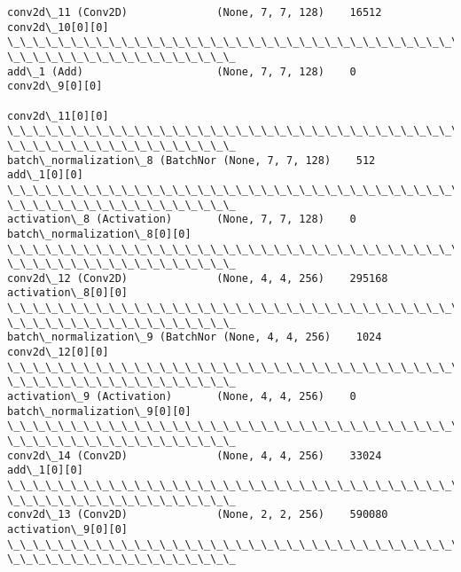 \documentclass[11pt]{article}
\begin{document}
\begin{Verbatim}[commandchars=\\\{\}]
conv2d\_11 (Conv2D)              (None, 7, 7, 128)    16512       conv2d\_10[0][0]
\_\_\_\_\_\_\_\_\_\_\_\_\_\_\_\_\_\_\_\_\_\_\_\_\_\_\_\_\_\_\_\_\_\_\_\_\_\_\_\_\_\_\_\_\_\_\_\_\_\_\_\_\_\_\_\_\_\_\_\_\_\_\_\_\_\_\_\_\_\_\_\_\_\_\_\_\_\_\_\_
\_\_\_\_\_\_\_\_\_\_\_\_\_\_\_\_\_\_
add\_1 (Add)                     (None, 7, 7, 128)    0           conv2d\_9[0][0]
                                                                 conv2d\_11[0][0]
\_\_\_\_\_\_\_\_\_\_\_\_\_\_\_\_\_\_\_\_\_\_\_\_\_\_\_\_\_\_\_\_\_\_\_\_\_\_\_\_\_\_\_\_\_\_\_\_\_\_\_\_\_\_\_\_\_\_\_\_\_\_\_\_\_\_\_\_\_\_\_\_\_\_\_\_\_\_\_\_
\_\_\_\_\_\_\_\_\_\_\_\_\_\_\_\_\_\_
batch\_normalization\_8 (BatchNor (None, 7, 7, 128)    512         add\_1[0][0]
\_\_\_\_\_\_\_\_\_\_\_\_\_\_\_\_\_\_\_\_\_\_\_\_\_\_\_\_\_\_\_\_\_\_\_\_\_\_\_\_\_\_\_\_\_\_\_\_\_\_\_\_\_\_\_\_\_\_\_\_\_\_\_\_\_\_\_\_\_\_\_\_\_\_\_\_\_\_\_\_
\_\_\_\_\_\_\_\_\_\_\_\_\_\_\_\_\_\_
activation\_8 (Activation)       (None, 7, 7, 128)    0
batch\_normalization\_8[0][0]
\_\_\_\_\_\_\_\_\_\_\_\_\_\_\_\_\_\_\_\_\_\_\_\_\_\_\_\_\_\_\_\_\_\_\_\_\_\_\_\_\_\_\_\_\_\_\_\_\_\_\_\_\_\_\_\_\_\_\_\_\_\_\_\_\_\_\_\_\_\_\_\_\_\_\_\_\_\_\_\_
\_\_\_\_\_\_\_\_\_\_\_\_\_\_\_\_\_\_
conv2d\_12 (Conv2D)              (None, 4, 4, 256)    295168
activation\_8[0][0]
\_\_\_\_\_\_\_\_\_\_\_\_\_\_\_\_\_\_\_\_\_\_\_\_\_\_\_\_\_\_\_\_\_\_\_\_\_\_\_\_\_\_\_\_\_\_\_\_\_\_\_\_\_\_\_\_\_\_\_\_\_\_\_\_\_\_\_\_\_\_\_\_\_\_\_\_\_\_\_\_
\_\_\_\_\_\_\_\_\_\_\_\_\_\_\_\_\_\_
batch\_normalization\_9 (BatchNor (None, 4, 4, 256)    1024        conv2d\_12[0][0]
\_\_\_\_\_\_\_\_\_\_\_\_\_\_\_\_\_\_\_\_\_\_\_\_\_\_\_\_\_\_\_\_\_\_\_\_\_\_\_\_\_\_\_\_\_\_\_\_\_\_\_\_\_\_\_\_\_\_\_\_\_\_\_\_\_\_\_\_\_\_\_\_\_\_\_\_\_\_\_\_
\_\_\_\_\_\_\_\_\_\_\_\_\_\_\_\_\_\_
activation\_9 (Activation)       (None, 4, 4, 256)    0
batch\_normalization\_9[0][0]
\_\_\_\_\_\_\_\_\_\_\_\_\_\_\_\_\_\_\_\_\_\_\_\_\_\_\_\_\_\_\_\_\_\_\_\_\_\_\_\_\_\_\_\_\_\_\_\_\_\_\_\_\_\_\_\_\_\_\_\_\_\_\_\_\_\_\_\_\_\_\_\_\_\_\_\_\_\_\_\_
\_\_\_\_\_\_\_\_\_\_\_\_\_\_\_\_\_\_
conv2d\_14 (Conv2D)              (None, 4, 4, 256)    33024       add\_1[0][0]
\_\_\_\_\_\_\_\_\_\_\_\_\_\_\_\_\_\_\_\_\_\_\_\_\_\_\_\_\_\_\_\_\_\_\_\_\_\_\_\_\_\_\_\_\_\_\_\_\_\_\_\_\_\_\_\_\_\_\_\_\_\_\_\_\_\_\_\_\_\_\_\_\_\_\_\_\_\_\_\_
\_\_\_\_\_\_\_\_\_\_\_\_\_\_\_\_\_\_
conv2d\_13 (Conv2D)              (None, 2, 2, 256)    590080
activation\_9[0][0]
\_\_\_\_\_\_\_\_\_\_\_\_\_\_\_\_\_\_\_\_\_\_\_\_\_\_\_\_\_\_\_\_\_\_\_\_\_\_\_\_\_\_\_\_\_\_\_\_\_\_\_\_\_\_\_\_\_\_\_\_\_\_\_\_\_\_\_\_\_\_\_\_\_\_\_\_\_\_\_\_
\_\_\_\_\_\_\_\_\_\_\_\_\_\_\_\_\_\_

\end{Verbatim}
\end{document}
